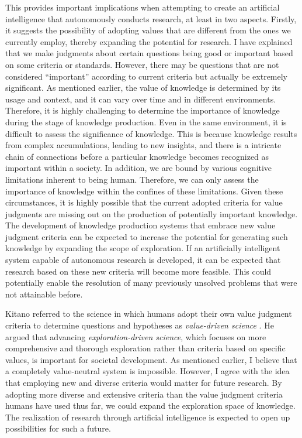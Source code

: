 \documentclass{book}
\begin{document}
This provides important implications when attempting to create an artificial intelligence that autonomously conducts research, at least in two aspects. Firstly, it suggests the possibility of adopting values that are different from the ones we currently employ, thereby expanding the potential for research. I have explained that we make judgments about certain questions being good or important based on some criteria or standards. However, there may be questions that are not considered ``important'' according to current criteria but actually be extremely significant. As mentioned earlier, the value of knowledge is determined by its usage and context, and it can vary over time and in different environments. Therefore, it is highly challenging to determine the importance of knowledge during the stage of knowledge production. Even in the same environment, it is difficult to assess the significance of knowledge. This is because knowledge results from complex accumulations, leading to new insights, and there is a intricate chain of connections before a particular knowledge becomes recognized as important within a society. In addition, we are bound by various cognitive limitations inherent to being human. Therefore, we can only assess the importance of knowledge within the confines of these limitations. Given these circumstances, it is highly possible that the current adopted criteria for value judgments are missing out on the production of potentially important knowledge. The development of knowledge production systems that embrace new value judgment criteria can be expected to increase the potential for generating such knowledge by expanding the scope of exploration. If an artificially intelligent system capable of autonomous research is developed, it can be expected that research based on these new criteria will become more feasible. This could potentially enable the resolution of many previously unsolved problems that were not attainable before.

Kitano referred to the science in which humans adopt their own value judgment criteria to determine questions and hypotheses as \textit{value-driven science} \cite{kitano2021nobel}. He argued that advancing \textit{exploration-driven science}, which focuses on more comprehensive and thorough exploration rather than criteria based on specific values, is important for societal development. As mentioned earlier, I believe that a completely value-neutral system is impossible. However, I agree with the idea that employing new and diverse criteria would matter for future research. By adopting more diverse and extensive criteria than the value judgment criteria humans have used thus far, we could expand the exploration space of knowledge. The realization of research through artificial intelligence is expected to open up possibilities for such a future.
\end{document}
